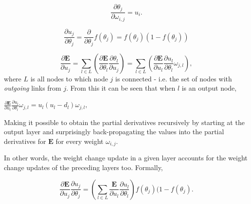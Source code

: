 \begin{equation}\label{delta_theta}
    \frac{\partial \theta_j}{\partial \omega_{i,j}} = u_i.
\end{equation}

\begin{equation}
    \frac{\partial u_j}{\partial \theta_j} = \frac{\partial}{\partial \theta_j} f(\theta_j) = f(\theta_j)(1-f(\theta_j))
\end{equation}

\begin{equation}
    \frac{\partial \textbf{E}}{\partial u_j} = \sum_{l \in L}(\frac{\partial \textbf{E}}{\partial \theta_l} 
    \frac{\partial \theta_l}{\partial u_j})
    = \sum_{l \in L}(\frac{\partial \textbf{E}}{\partial u_l} \frac{\partial u_l}{\partial \theta_l} \omega_{j,l}),
\end{equation}
where $L$ is all nodes to which node $j$ is connected - i.e. the set of nodes with \textit{outgoing} links from $j$. From this it can be seen that when $l$ is an output node,

\begin{center}
\begin{math}
    \frac{\partial \textbf{E}}{\partial u_l} \frac{\partial u_l}{\partial \theta_l} \omega_{j,l} = 
    u_l (u_l - d_l) \omega_{j,l},
\end{math}
\end{center}
Making it possible to obtain the partial derivatives recursively by starting at the output layer and surprisingly back-propagating the values into the partial derivatives for $\textbf{E}$ for every weight $\omega_{i,j}$.

In other words, the weight change update in a given layer accounts for the weight change updates of the preceding layers too. Formally,

\begin{equation}\label{recursive_derivative_error_activation_input}
    \frac{\partial \textbf{E}}{\partial u_j}\frac{\partial u_j}{\partial \theta_j} = 
    (\sum_{l \in L}\frac{\textbf{E}}{\partial u_l}\frac{\partial u_l}{\partial \theta_l}) f(\theta_j)(1-f(\theta_j).
\end{equation}


